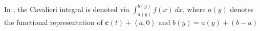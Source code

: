 \documentclass{article}
\theoremstyle{theorem}
\theoremstyle{definition}
\begin{document}
\noindent
In \cite{ackermann12}, the Cavalieri integral is denoted via $\int_{a(y)}^{b(y)} f(x)~dx$, where $a(y)$ denotes the functional representation of $\mathbf{c}(t) + \left <a,0 \right >$ and $b(y) = a(y)+(b-a)$ 


% 
% 
\end{document}
